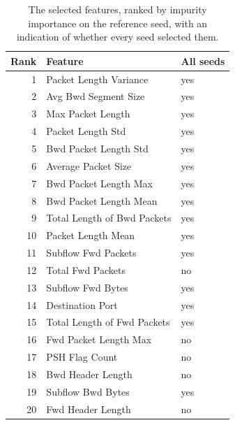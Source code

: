 \begin{table}[htbp]
\centering
\caption{The selected features, ranked by impurity importance on the reference seed, with an indication of whether every seed selected them.}
\label{tab:featlist}
\scriptsize
\begin{tabular}{rll}
\hline
Rank & Feature & All seeds \\
\hline
1 & Packet Length Variance & yes \\
2 & Avg Bwd Segment Size & yes \\
3 & Max Packet Length & yes \\
4 & Packet Length Std & yes \\
5 & Bwd Packet Length Std & yes \\
6 & Average Packet Size & yes \\
7 & Bwd Packet Length Max & yes \\
8 & Bwd Packet Length Mean & yes \\
9 & Total Length of Bwd Packets & yes \\
10 & Packet Length Mean & yes \\
11 & Subflow Fwd Packets & yes \\
12 & Total Fwd Packets & no \\
13 & Subflow Fwd Bytes & yes \\
14 & Destination Port & yes \\
15 & Total Length of Fwd Packets & yes \\
16 & Fwd Packet Length Max & no \\
17 & PSH Flag Count & no \\
18 & Bwd Header Length & no \\
19 & Subflow Bwd Bytes & yes \\
20 & Fwd Header Length & no \\
\hline
\end{tabular}
\end{table}
